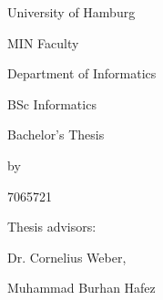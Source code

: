 \begin{titlepage}
    \centering
    University of Hamburg \par
    MIN Faculty \par
    Department of Informatics \par
    BSc Informatics \par
    \vspace{6\baselineskip}
    {\Large Bachelor's Thesis\par}
    {\Huge \thetitle \par}
    \vspace{6\baselineskip}
    by\par
    {\Large \theauthor \par 7065721 \par}
    \vfill
    Thesis advisors:\par
    {\large Dr. Cornelius Weber, \par Muhammad Burhan Hafez}
\end{titlepage}
